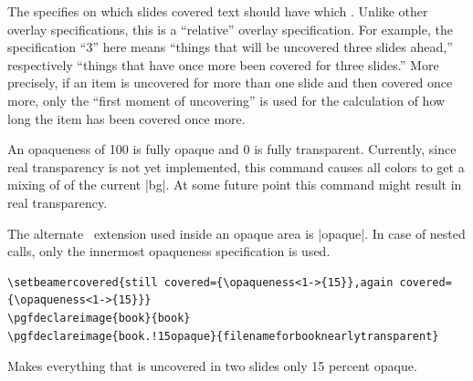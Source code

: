 \begin{command}{\opaqueness{}}
  The  specifies on which slides covered text should have which . Unlike other overlay specifications, this  is a ``relative'' overlay specification. For example, the specification ``3'' here means ``things that will be uncovered three slides ahead,'' respectively ``things that have once more been covered for three slides.'' More precisely, if an item is uncovered for more than one slide and then covered once more, only the ``first moment of uncovering'' is used for the calculation of how long the item has been covered once more.

  An opaqueness of 100 is fully opaque and 0 is fully transparent. Currently, since real transparency is not yet implemented, this command causes all colors to get a mixing of  of the current |bg|. At some future point this command might result in real transparency.

  The alternate \pgfname\ extension used inside an opaque area is |opaque|. In case of nested calls, only the innermost opaqueness specification is used.
  \example
\begin{verbatim}
\setbeamercovered{still covered={\opaqueness<1->{15}},again covered={\opaqueness<1->{15}}}
\pgfdeclareimage{book}{book}
\pgfdeclareimage{book.!15opaque}{filenameforbooknearlytransparent}
\end{verbatim}

  Makes everything that is uncovered in two slides only 15 percent opaque.
\end{command}
